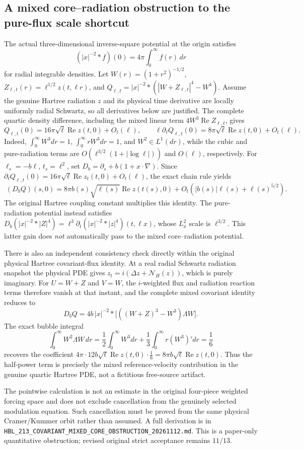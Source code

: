 \subsection*{A mixed core--radiation obstruction to the pure-flux scale shortcut}
The actual three-dimensional inverse-square potential at the origin satisfies
\[
 (|x|^{-2}*f)(0)=4\pi\int_0^\infty f(r)\,dr
\]
for radial integrable densities. Let
\(W(r)=(1+r^2)^{-1/2}\), \(Z_{\ell,t}(r)=\ell^{1/2}z(t,\ell r)\),
and \(Q_{\ell,t}=|x|^{-2}*(|W+Z_{\ell,t}|^4-W^4)\).
Assume the genuine Hartree radiation \(z\) and its physical time derivative
are locally uniformly radial Schwartz, so all derivatives below are
justified. The complete quartic density difference, including the mixed
linear term \(4W^3\operatorname{Re}Z_{\ell,t}\), gives
\[
 Q_{\ell,t}(0)=16\pi\sqrt{\ell}\operatorname{Re}z(t,0)+O_t(\ell),
 \qquad
 \ell\partial_\ell Q_{\ell,t}(0)
 =8\pi\sqrt{\ell}\operatorname{Re}z(t,0)+O_t(\ell).
\]
Indeed, \(\int_0^\infty W^3dr=1\), \(\int_0^\infty rW^3dr=1\),
and \(W^2\in L^1(dr)\), while the cubic and pure-radiation terms are
\(O(\ell^{3/2}(1+|\log\ell|))\) and \(O(\ell)\), respectively.
For \(\ell_s=-b\ell\), \(t_s=\ell^2\), set
\(D_b=\partial_s+b(1+x\cdot\nabla)\). Since
\(\partial_tQ_{\ell,t}(0)
 =16\pi\sqrt{\ell}\operatorname{Re}z_t(t,0)+O_t(\ell)\),
the exact chain rule yields
\[
 \boxed{\;
 (D_bQ)(s,0)=8\pi b(s)\sqrt{\ell(s)}
      \operatorname{Re}z(t(s),0)
  +O_t\!\left(|b(s)|\ell(s)+\ell(s)^{5/2}\right).\;}
\]
The original Hartree coupling constant multiplies this identity.
The pure-radiation potential instead satisfies
\(D_b(|x|^{-2}*|Z|^4)
 =\ell^3\partial_t(|x|^{-2}*|z|^4)(t,\ell x)\),
whose \(L^2_x\) scale is \(\ell^{3/2}\). This latter gain does
\emph{not} automatically pass to the mixed core--radiation potential.

There is also an independent consistency check directly within
the original physical Hartree covariant-flux identity.
At a real radial Schwartz radiation snapshot the physical PDE gives
\(z_t=i(\Delta z+\mathcal N_H(z))\), which is purely imaginary.
For \(U=W+Z\) and \(V=W\), the \(i\)-weighted flux and radiation
reaction terms therefore vanish at that instant, and the complete
mixed covariant identity reduces to
\[
 D_bQ=4b\,|x|^{-2}*
       \bigl[((W+Z)^3-W^3)\Lambda W\bigr].
\]
The exact bubble integral
\[
 \int_0^\infty W^2\Lambda W\,dr
 =\frac12\int_0^\infty W^3dr+
  \frac13\int_0^\infty r(W^3)'dr=\frac16
\]
recovers the coefficient \(4\pi\cdot 12b\sqrt{\ell}
\operatorname{Re}z(t,0)\cdot\frac16
=8\pi b\sqrt{\ell}\operatorname{Re}z(t,0)\).
Thus the half-power term is precisely the mixed reference-velocity
contribution in the genuine quartic Hartree PDE, not a fictitious
free-source artifact.

The pointwise calculation is not an estimate in the original
four-piece weighted forcing space and does not exclude cancellation
from the genuinely selected modulation equation. Such cancellation
must be proved from the same physical Cramer/Kummer orbit rather
than assumed. A full derivation is in
\texttt{HBL\_213\_COVARIANT\_MIXED\_CORE\_OBSTRUCTION\_20261112.md}.
This is a paper-only quantitative obstruction; revised original
strict acceptance remains \(11/13\).
